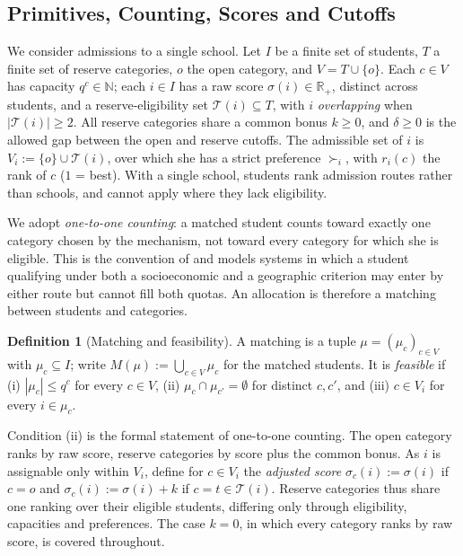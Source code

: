 \documentclass[a4paper,twoside]{article}
\theoremstyle{definition}
\newtheorem{definition}{Definition}
\renewcommand{\T}{\mathcal{T}}
\renewcommand{\R}{\mathbb{R}}
\begin{document}
\subsection{Primitives, Counting, Scores and Cutoffs}

We consider admissions to a single school. Let $I$ be a finite set of students, $T$ a finite set of reserve categories, $o$ the open category, and $V=T\cup\{o\}$. Each $c\in V$ has capacity $q^c\in\mathbb{N}$; each $i\in I$ has a raw score $\sigma(i)\in\R_+$, distinct across students, and a reserve-eligibility set $\T(i)\subseteq T$, with $i$ \emph{overlapping} when $|\T(i)|\ge2$. All reserve categories share a common bonus $k\ge0$, and $\delta\ge0$ is the allowed gap between the open and reserve cutoffs. The admissible set of $i$ is $V_i:=\{o\}\cup\T(i)$, over which she has a strict preference $\succ_i$, with $r_i(c)$ the rank of $c$ ($1$ = best). With a single school, students rank admission routes rather than schools, and cannot apply where they lack eligibility.

We adopt \emph{one-to-one counting}: a matched student counts toward exactly one category chosen by the mechanism, not toward every category for which she is eligible. This is the convention of \cite{KHIY17a,AyBo21a,GKK+17a} and models systems in which a student qualifying under both a socioeconomic and a geographic criterion may enter by either route but cannot fill both quotas. An allocation is therefore a matching between students and categories.

\begin{definition}[Matching and feasibility]
A matching is a tuple $\mu=(\mu_c)_{c\in V}$ with $\mu_c\subseteq I$; write $M(\mu):=\bigcup_{c\in V}\mu_c$ for the matched students. It is \emph{feasible} if (i) $|\mu_c|\le q^c$ for every $c\in V$, (ii) $\mu_c\cap\mu_{c'}=\emptyset$ for distinct $c,c'$, and (iii) $c\in V_i$ for every $i\in\mu_c$.
\end{definition}

Condition (ii) is the formal statement of one-to-one counting. The open category ranks by raw score, reserve categories by score plus the common bonus. As $i$ is assignable only within $V_i$, define for $c\in V_i$ the \emph{adjusted score} $\sigma_c(i):=\sigma(i)$ if $c=o$ and $\sigma_c(i):=\sigma(i)+k$ if $c=t\in\T(i)$. Reserve categories thus share one ranking over their eligible students, differing only through eligibility, capacities and preferences. The case $k=0$, in which every category ranks by raw score, is covered throughout.
\end{document}
